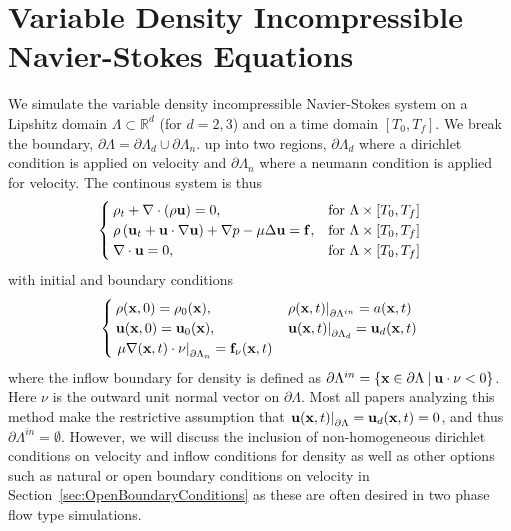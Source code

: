 \documentclass[letterpaper]{erdc}
\begin{document}
\chapter{Variable Density Incompressible Navier-Stokes Equations}\label{ch:vardensity_navierstokes_description}
We simulate the variable density incompressible Navier-Stokes system on a Lipshitz domain $\Lambda\subset \mathbb{R}^d$ (for $d=2,3$) and on a time domain $[T_0,T_f]$.  We break the boundary, $\partial\Lambda=\partial\Lambda_d\cup\partial\Lambda_n$. up into two regions, $\partial\Lambda_d$ where a dirichlet condition is applied on velocity and $\partial\Lambda_n$ where a neumann condition is applied for velocity.  The continous system is thus
\begin{equation}\label{eqn:variabledensityNavierStokes}
  \begin{cases}
    \rho_t + \nabla\cdot\left( \rho \textbf{u}\right) = 0, & \mbox{for }\Lambda\times[T_0,T_f]\\
    \rho\left(\textbf{u}_t + \textbf{u}\cdot\nabla\textbf{u}  \right) + \nabla p - \mu\Delta \textbf{u} = \mathbf{f}, &\mbox{for }\Lambda\times[T_0,T_f]\\
    \nabla\cdot \textbf{u} = 0, &\mbox{for } \Lambda\times[T_0,T_f]
  \end{cases}
\end{equation}
with initial and boundary conditions
\begin{equation}\label{eqn:variabledensityNavierStokesBCIC}
  \begin{cases}
    \rho(\textbf{x},0) = \rho_0(\textbf{x}), & \left.\rho(\textbf{x},t)\right|_{\partial\Lambda^{in}} = a(\textbf{x},t)\\
    \textbf{u}(\textbf{x},0) = \textbf{u}_0(\textbf{x}), & \left.\textbf{u}(\textbf{x},t)\right|_{\partial\Lambda_d} = \textbf{u}_d(\textbf{x},t)\\
    \left.\mu\nabla(\textbf{x},t)\cdot\nu\right|_{\partial\Lambda_n} = \mathbf{f}_{\nu}(\textbf{x},t) 
  \end{cases}
\end{equation}
where the inflow boundary for density is defined as $\partial\Lambda^{in} = \{ \textbf{x}\in \partial\Lambda \:|\: \textbf{u}\cdot\nu <0 \}$.  Here $\nu$ is the outward unit normal vector on $\partial\Lambda$.  Most all papers analyzing this method make the restrictive assumption that $\left.\textbf{u}(\textbf{x},t)\right|_{\partial\Lambda} = \textbf{u}_d(\textbf{x},t) = 0$, and thus $\partial\Lambda^{in}= \emptyset$.  However, we will discuss the inclusion of non-homogeneous dirichlet conditions on velocity and inflow conditions for density as well as other options such as natural or open boundary conditions on velocity in Section~\ref{sec:OpenBoundaryConditions} as these are often desired in two phase flow type simulations.  
\end{document}
